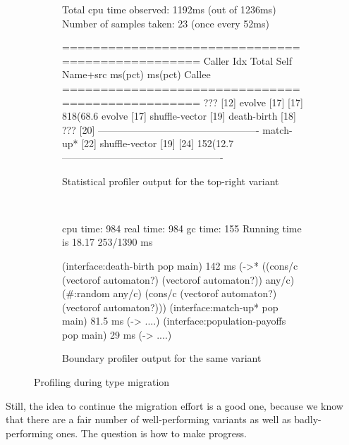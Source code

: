 \begin{figure}[htb]
\begin{subfigure}[t]{0.53\columnwidth}
    \footnotesize
    \begin{boxedverbatim}
  Total cpu time observed: 1192ms (out of 1236ms)
  Number of samples taken: 23 (once every 52ms)

=================================================
                              Caller
 Idx   Total       Self      Name+src
       ms(pct)     ms(pct)    Callee
=================================================
                              ??? [12]
                              evolve [17]
[17]  818(68.6%
                              evolve [17]
                              shuffle-vector [19]
                              death-birth [18]
                              ??? [20]
-------------------------------------------------
                              match-up* [22]
                              shuffle-vector [19]
[24]  152(12.7%
-------------------------------------------------
    \end{boxedverbatim}
    \caption{Statistical profiler output for the top-right variant} \label{f:fsm-code:statistical}
  \end{subfigure}~\begin{subfigure}[t]{0.44\columnwidth}
    \footnotesize
    \begin{boxedverbatim}
cpu time: 984 real time: 984 gc time: 155
Running time is 18.17%
253/1390 ms

(interface:death-birth pop main)
  142 ms
  (->* ((cons/c (vectorof automaton?)
                (vectorof automaton?))
        any/c)
       (#:random any/c)
       (cons/c (vectorof automaton?)
               (vectorof automaton?)))
(interface:match-up* pop main)
  81.5 ms
  (-> ....)
(interface:population-payoffs pop main)
  29 ms
  (-> ....)


    \end{boxedverbatim}
    \caption{Boundary profiler output for the same variant} \label{f:fsm-code:boundary}
  \end{subfigure}

  \caption{Profiling during type migration} \label{f:fsm-code}
\end{figure}

Still, the idea to continue the migration effort is a good one, because we know
that there are a fair number of well-performing
variants as well as badly-performing ones. The question is how to make progress.

